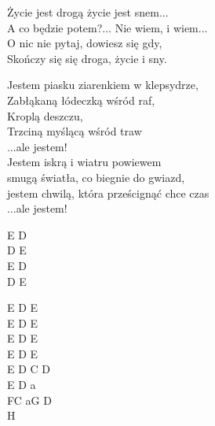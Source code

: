 \begin{text}
    Życie jest drogą życie jest snem...\\
    A co będzie potem?... Nie wiem, i wiem...\\
    O nic nie pytaj, dowiesz się gdy,\\
    Skończy się się droga, życie i sny.

    Jestem piasku ziarenkiem w klepsydrze,\\
    Zabłąkaną łódeczką wśród raf,\\
    Kroplą deszczu,\\
    Trzciną myślącą wśród traw\\
    ...ale jestem!\\
    Jestem iskrą i wiatru powiewem\\
    smugą światła, co biegnie do gwiazd,\\
    jestem chwilą, która prześcignąć chce czas\\
    ...ale jestem!
\end{text}
\begin{chord}
    E D\\
    D E\\
    E D\\
    D E

    E D E\\
    E D E\\
    E D E\\
    E D E\\
    E D C D\\
    E D a\\
    FC aG D\\
    H
\end{chord}
